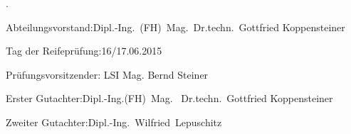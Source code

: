 \begin{titlepage}
	{\color{white}.}
	\bigskip
	\vspace{14cm}
	\noindent%

	Abteilungsvorstand:\hfill Dipl.-Ing.~(FH)\ Mag.\ Dr.techn.\ Gottfried Koppensteiner\\
	\bigskip
	\bigskip

	Tag der Reifeprüfung:\hfill 16/17.06.2015\\
	\bigskip
	\bigskip

	Prüfungsvorsitzender:\hfill
	LSI Mag. Bernd Steiner\\
	\smallskip

	Erster Gutachter:\hfill Dipl.-Ing.(FH)\ Mag. \ Dr.techn.\ Gottfried Koppensteiner\\
	\smallskip

	Zweiter Gutachter:\hfill 	Dipl.-Ing.\ Wilfried\ Lepuschitz\\
		\smallskip
\end{titlepage}
